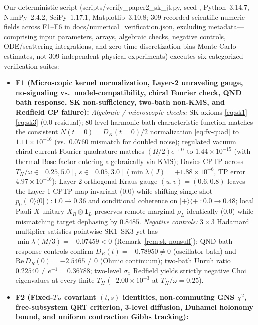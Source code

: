\documentclass[11pt,a4paper]{article}
\theoremstyle{definition}
\theoremstyle{remark}
\newcommand{\1}{\mathbf{1}}
\newcommand{\code}[1]{{\scriptsize\ttfamily #1}}
\begin{document}
Our deterministic script (\code{scripts/\allowbreak verify\_\allowbreak paper2\_\allowbreak sk\_\allowbreak jt.\allowbreak py}, seed \code{20261127}, Python~3.14.7, NumPy~2.4.2, SciPy~1.17.1, Matplotlib~3.10.8; 309 recorded scientific numeric fields across F1--F6 in \code{docs/\allowbreak numer\allowbreak ical\_\allowbreak veri\allowbreak fication.\allowbreak json}, excluding metadata---comprising input parameters, arrays, algebraic checks, negative controls, ODE/scattering integrations, and zero time-discretization bias Monte Carlo estimates, not 309 independent physical experiments) executes six categorized verification suites:
\begin{itemize}
  \item \textbf{F1 (Microscopic kernel normalization, Layer-2 unraveling gauge, no-signaling vs.\ model-compatibility, chiral Fourier check, QND bath response, SK non-sufficiency, two-bath non-KMS, and Redfield CP failure):}
  \emph{Algebraic / microscopic checks:} SK axioms \eqref{eq:sk1}--\eqref{eq:sk3} ($0.0$ residual); 80-level harmonic-bath characteristic function matches the consistent $N(t=0)=D_K(t=0)/2$ normalization \eqref{eq:fv-quad} to $1.11\times 10^{-16}$ (vs.\ $0.0760$ mismatch for doubled noise); regulated vacuum chiral-current Fourier quadrature matches $(\Omega/2)e^{-\epsilon\Omega}$ to $1.44\times 10^{-15}$ (with thermal Bose factor entering algebraically via KMS); Davies CPTP across $T_H/\omega\in[0.25,5.0]$, $s\in[0.05,3.0]$ ($\min\lambda(J)=+1.88\times 10^{-6}$, TP error $4.97\times 10^{-16}$); Layer-2 orthogonal Kraus gauge $(u,v)=(0.6,0.8)$ leaves the Layer-1 CPTP map invariant ($0.0$) while shifting single-shot $p_0(|0\rangle\langle 0|):1.0\to 0.36$ and conditional coherence on $|+\rangle\langle +|:0.0\to 0.48$; local Pauli-$X$ unitary $X_R\otimes\1_L$ preserves remote marginal $\rho_L$ identically ($0.0$) while mismatching target dephasing by $0.8485$.
  \emph{Negative controls:} $3\times 3$ Hadamard multiplier satisfies pointwise SK1--SK3 yet has $\min\lambda(M/3)=-0.07459 < 0$ (Remark~\ref{rem:sk-nonsuff}); QND bath-response controls confirm $D_R(t)=-0.78950\neq 0$ (oscillator bath) and $\mathrm{Re}\,D_R(0)=-2.5465\neq 0$ (Ohmic continuum); two-bath Unruh ratio $0.22540 \neq e^{-1}=0.36788$; two-level $\sigma_x$ Redfield yields strictly negative Choi eigenvalues at every finite $T_H$ ($-2.00\times 10^{-3}$ at $T_H/\omega=0.25$).
  \item \textbf{F2 (Fixed-$T_H$ covariant $(t,s)$ identities, non-commuting GNS $\chi^2$, free-subsystem QRT criterion, 3-level diffusion, Duhamel holonomy bound, and uniform contraction Gibbs tracking):}

\end{itemize}
\end{document}
